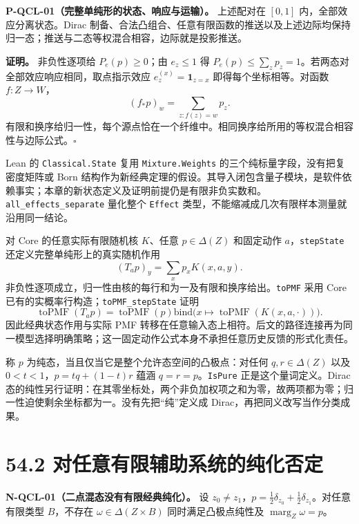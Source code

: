 \documentclass[
  11pt,
  oneside]{book}
\begin{document}
\protect\hypertarget{p-qcl-01}{}{}

\textbf{P-QCL-01（完整单纯形的状态、响应与运输）。} 上述配对在 \([0,1]\)
内，全部效应分离状态。Dirac
制备、合法凸组合、任意有限函数的推送以及上述边际均保持归一态；推送与二态等权混合相容，边际就是投影推送。

\textbf{证明。} 非负性逐项给 \(P_e(p)\ge0\)；由 \(e_z\le1\) 得
\(P_e(p)\le\sum_zp_z=1\)。若两态对全部效应响应相同，取点指示效应
\(e^{(x)}_z=\mathbf1_{z=x}\) 即得每个坐标相等。对函数 \(f:Z\to W\)， \[
(f_*p)_w=\sum_{z:f(z)=w}p_z.
\]
有限和换序给归一性，每个源点恰在一个纤维中。相同换序给所用的等权混合相容性与边际公式。\(\square\)

Lean 的 \texttt{Classical.State} 复用 \texttt{Mixture.Weights}
的三个纯标量字段，没有把复密度矩阵或 Born
结构作为新经典定理的假设。其导入闭包含量子模块，是软件依赖事实；本章的新状态定义及证明前提仍是有限非负实数和。\texttt{all\_\allowbreak effects\_\allowbreak separate}
量化整个 \texttt{Effect}
类型，不能缩减成几次有限样本测量就沿用同一结论。

对 Core 的任意实际有限随机核 \(K\)、任意 \(p\in\Delta(Z)\) 和固定动作
\(a\)，\texttt{stepState} 还定义完整单纯形上的真实随机作用 \[
(T_ap)_y=\sum_xp_xK(x,a,y).
\]
非负性逐项成立，归一性由核的每行和为一及有限和换序给出。\texttt{toPMF}
采用 Core 已有的实概率行构造；\texttt{toPMF\_\allowbreak stepState} 证明 \[
\operatorname{toPMF}(T_ap)
=\operatorname{toPMF}(p)\mathbin{\mathrm{bind}}
\bigl(x\mapsto\operatorname{toPMF}(K(x,a,\cdot))\bigr).
\] 因此经典状态作用与实际 PMF
转移在任意输入态上相符。后文的路径连接再为同一模型选择明确策略；这一固定动作公式本身不承担任意历史反馈的形式化责任。

称 \(p\) 为纯态，当且仅当它是整个允许态空间的凸极点：对任何
\(q,r\in\Delta(Z)\) 以及 \(0<t<1\)，\(p=tq+(1-t)r\) 蕴涵
\(q=r=p\)。\texttt{IsPure} 正是这个量词定义。Dirac
态的纯性另行证明：在其零坐标处，两个非负加权项之和为零，故两项都为零；归一性迫使剩余坐标都为一。没有先把``纯''定义成
Dirac，再把同义改写当作分类成果。

\hypertarget{ux5bf9ux4efbux610fux6709ux9650ux8f85ux52a9ux7cfbux7edfux7684ux7eafux5316ux5426ux5b9a}{%
\section{54.2
对任意有限辅助系统的纯化否定}\label{ux5bf9ux4efbux610fux6709ux9650ux8f85ux52a9ux7cfbux7edfux7684ux7eafux5316ux5426ux5b9a}}

\protect\hypertarget{n-qcl-01}{}{}

\textbf{N-QCL-01（二点混态没有有限经典纯化）。} 设
\(z_0\ne z_1\)，\(p=\tfrac12\delta_{z_0}+\tfrac12\delta_{z_1}\)。对任意有限类型
\(B\)，不存在 \(\omega\in\Delta(Z\times B)\) 同时满足凸极点纯性及
\(\operatorname{marg}_Z\omega=p\)。
\end{document}
